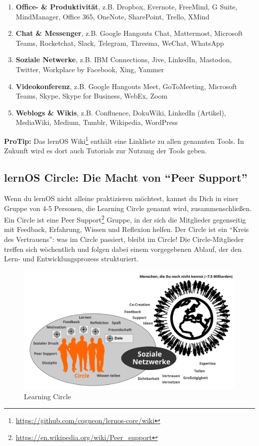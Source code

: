 \documentclass[
  ngerman,
  paper=a4,
,captions=tableheading
]{scrartcl}
\DeclareRobustCommand{\href}[2]{#2\footnote{\url{#1}}}
\providecommand{\tightlist}{%
  \setlength{\itemsep}{0pt}\setlength{\parskip}{0pt}}
\begin{document}
\begin{enumerate}
\def\labelenumi{\arabic{enumi}.}
\tightlist
\item
  \textbf{Office- \& Produktivität}, z.B. Dropbox, Evernote, FreeMind, G
  Suite, MindManager, Office 365, OneNote, SharePoint, Trello, XMind
\item
  \textbf{Chat \& Messenger}, z.B. Google Hangouts Chat, Mattermost,
  Microsoft Teams, Rocketchat, Slack, Telegram, Threema, WeChat,
  WhatsApp
\item
  \textbf{Soziale Netwerke}, z.B. IBM Connections, Jive, LinkedIn,
  Mastodon, Twitter, Workplace by Facebook, Xing, Yammer
\item
  \textbf{Videokonferenz}, z.B. Google Hangouts Meet, GoToMeeting,
  Microsoft Teams, Skype, Skype for Business, WebEx, Zoom
\item
  \textbf{Weblogs \& Wikis}, z.B. Confluence, DokuWiki, LinkedIn
  (Artikel), MediaWiki, Medium, Tumblr, Wikipedia, WordPress
\end{enumerate}

\textbf{ProTip:} Das
\href{https://github.com/cogneon/lernos-core/wiki}{lernOS Wiki} enthält
eine Linkliste zu allen genannten Tools. In Zukunft wird es dort auch
Tutorials zur Nutzung der Tools geben.

\hypertarget{lernos-circle-die-macht-von-peer-support}{%
\subsection{lernOS Circle: Die Macht von ``Peer
Support''}\label{lernos-circle-die-macht-von-peer-support}}

Wenn du lernOS nicht alleine praktizieren möchtest, kannst du Dich in
einer Gruppe von 4-5 Personen, die Learning Circle genannt wird,
zusammenschließen. Ein Circle ist eine
\href{https://en.wikipedia.org/wiki/Peer_support}{Peer Support} Gruppe,
in der sich die Mitglieder gegenseitig mit Feedback, Erfahrung, Wissen
und Reflexion helfen. Der Circle ist ein ``Kreis des Vertrauens'': was
im Circle passiert, bleibt im Circle! Die Circle-Mitglieder treffen sich
wöchentlich und folgen dabei einem vorgegebenen Ablauf, der den Lern-
und Entwicklungsprozess strukturiert.

\begin{figure}
\centering
\includegraphics{./tex2pdf.-c0ed5a8631023970/0d67e1021e5c580615fa48b0a1dfe050338091a7.png}
\caption{Learning Circle}
\end{figure}
\end{document}
